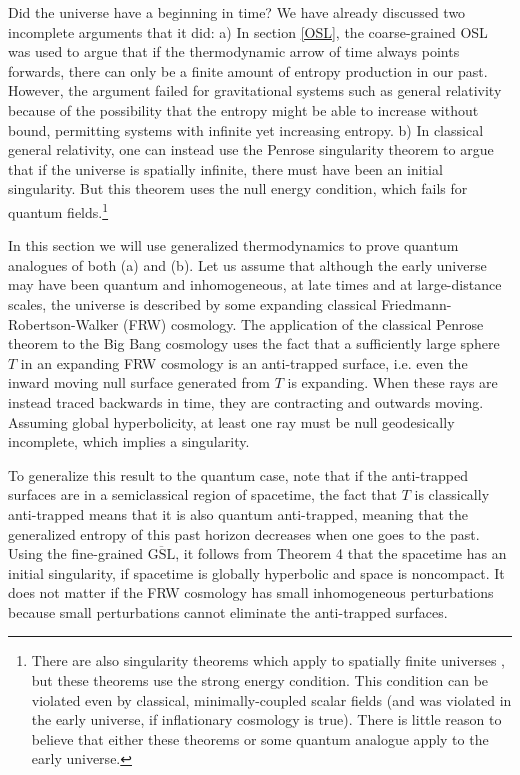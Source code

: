 \documentclass{article}
\begin{document}
Did the universe have a beginning in time?  We have already discussed two incomplete arguments that it did:  a) In section \ref{OSL}, the coarse-grained OSL was used to argue that if the thermodynamic arrow of time always points forwards, there can only be a finite amount of entropy production in our past.  However, the argument failed for gravitational systems such as general relativity because of the possibility that the entropy might be able to increase without bound, permitting systems with infinite yet increasing entropy.  b) In classical general relativity, one can instead use the Penrose singularity theorem to argue that if the universe is spatially infinite, there must have been an initial singularity.  But this theorem uses the null energy condition, which fails for quantum fields.\footnote{There are also singularity theorems which apply to spatially finite universes \cite{HawkingEllis}, but these theorems use the strong energy condition.  This condition can be violated even by classical, minimally-coupled scalar fields (and was violated in the early universe, if inflationary cosmology is true).  There is little reason to believe that either these theorems or some quantum analogue apply to the early universe.}

In this section we will use generalized thermodynamics to prove quantum analogues of both (a) and (b).  Let us assume that although the early universe may have been quantum and inhomogeneous, at late times and at large-distance scales, the universe is described by some expanding classical Friedmann-Robertson-Walker (FRW) cosmology.  The application of the classical Penrose theorem to the Big Bang cosmology uses the fact that a sufficiently large sphere $T$ in an expanding FRW cosmology is an anti-trapped surface, i.e. even the inward moving null surface generated from $T$ is expanding.  When these rays are instead traced backwards in time, they are contracting and outwards moving.  Assuming global hyperbolicity, at least one ray must be null geodesically incomplete, which implies a singularity.

To generalize this result to the quantum case, note that if the anti-trapped surfaces are in a semiclassical region of spacetime, the fact that $T$ is classically anti-trapped means that it is also quantum anti-trapped, meaning that the generalized entropy of this past horizon decreases when one goes to the past.  Using the fine-grained $\overline{\mathrm{GSL}}$, it follows from Theorem 4 that the spacetime has an initial singularity, if spacetime is globally hyperbolic and space is noncompact.  It does not matter if the FRW cosmology has small inhomogeneous perturbations because small perturbations cannot eliminate the anti-trapped surfaces.
\end{document}
